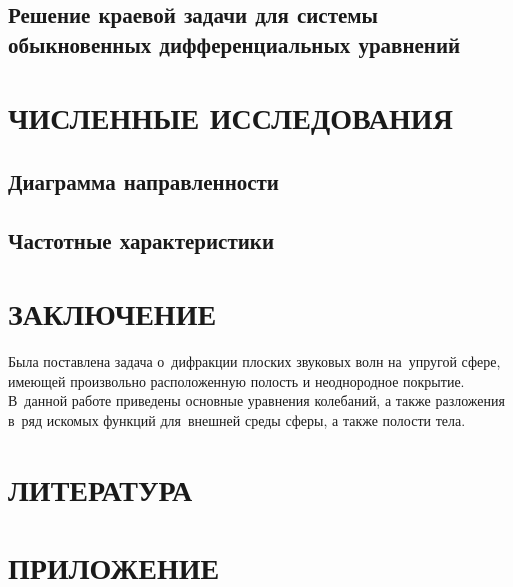 \subsection{Решение краевой задачи для системы обыкновенных дифференциальных уравнений}

\newpage
\section{ЧИСЛЕННЫЕ ИССЛЕДОВАНИЯ}

\newpage
\subsection{Диаграмма направленности}

\newpage
\subsection{Частотные характеристики}


\newpage
\section*{ЗАКЛЮЧЕНИЕ}
Была поставлена задача о~дифракции плоских звуковых волн на~упругой сфере, имеющей произвольно расположенную полость и неоднородное покрытие. В~данной работе приведены основные уравнения колебаний, а также разложения в~ряд искомых функций для~внешней среды сферы, а также полости тела.

\newpage
\section*{ЛИТЕРАТУРА}

\newpage
\section*{ПРИЛОЖЕНИЕ}
